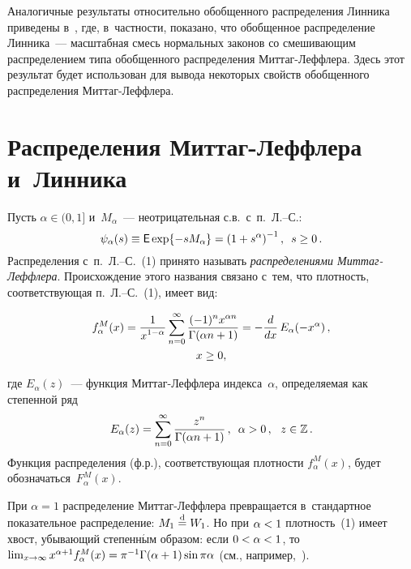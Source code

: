 \begin{multicols}{2}
Аналогичные результаты относительно обобщенного распределения
Линника приведены в~\cite{KorolevGorsheninZeifman2018}, где,
в~частности, показано, что обобщенное распределение Линника~--- масштабная 
смесь нормальных законов со смешивающим распределением типа обобщенного 
распределения Мит\-таг-Леф\-фле\-ра. Здесь этот результат будет использован 
для вывода некоторых свойств обобщенного распределения Мит\-таг-Леф\-флера.

\vspace*{-4pt}

\section{Распределения Миттаг-Леффлера и~Линника}

Пусть
$\alpha\in(0,1]$ и~$M_{\alpha}$~--- неотрицательная с.в.\ 
с~п.~Л.--С.:
\begin{equation}
\psi_{\alpha}(s)\equiv {\sf
E}\exp\{-sM_{\alpha}\}=\left(1+s^{\alpha}\right)^{-1},\enskip
s\ge0\,.\label{e1-gzk}
\end{equation}
Распределения с~п.~Л.--С.~(1) принято называть \textit{распределениями
Мит\-таг-Леф\-фле\-ра}. Происхождение этого названия связано с~тем, что
плотность, соответствующая п.~Л.--С.~(1), имеет вид:

\noindent
\begin{multline*}
f_{\alpha}^{M}(x)=\displaystyle\frac{\displaystyle 1\mathstrut}{\displaystyle x^{1-\alpha}\mathstrut}\sum\limits_{n=0}^{\infty}\displaystyle\frac{\displaystyle (-1)^nx^{\alpha
n}\mathstrut}{\displaystyle \Gamma(\alpha n+1)\mathstrut}=-\displaystyle\frac{\displaystyle d\mathstrut}{\displaystyle dx\mathstrut}\,E_{\alpha}(-x^{\alpha})\,,\\
x\ge0,
\end{multline*}

\vspace*{-2pt}

\noindent
где $E_{\alpha}(z)$~--- функция Мит\-таг-Леф\-фле\-ра индекса~$\alpha$,
определяемая как степенной ряд
$$
E_{\alpha}(z)=\sum\limits_{n=0}^{\infty}\displaystyle\frac{\displaystyle z^n\mathstrut}{\displaystyle \Gamma(\alpha
n+1)\mathstrut}\,,\enskip \alpha>0\,,\ \ z\in\mathbb{Z}\,.
$$
Функция распределения (ф.р.), соответствующая плотности
$f_{\alpha}^{M}(x)$, будет обозначаться~$F_{\alpha}^{M}(x)$.

При $\alpha=1$ распределение Мит\-таг-Леф\-фле\-ра превращается 
в~стандартное показательное распределение: $M_1\hm\eqd W_1$. Но при
$\alpha\hm<1$ плот\-ность~(1) имеет хвост, убывающий степенн$\acute{\mbox{ы}}$м
образом: если $0\hm<\alpha\hm<1$, то
$\lim\nolimits_{x\to\infty}
x^{\alpha+1}f_\alpha^{M}(x)\hm=\pi^{-1}\Gamma(\alpha\hm+1)\sin\pi\alpha$
(см., например,~\cite{Kilbas2014}).


\end{multicols}
